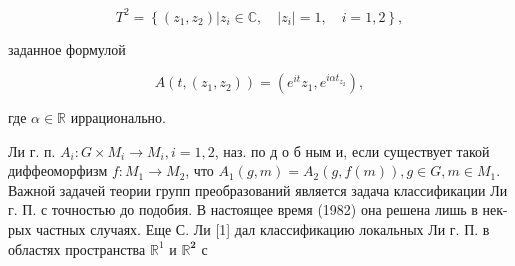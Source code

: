 \documentclass[10pt]{article}
\begin{document}
\[

T^{2}=\left\{\left(z_{1}, z_{2}\right)\left|z_{i} \in \mathbb{C}, \quad\right| z_{i} \mid=1, \quad i=1,2\right\},

\]



заданное формулой



\[

A\left(t,\left(z_{1}, z_{2}\right)\right)=\left(e^{i t} z_{1}, e^{i \alpha t_{z_{2}}}\right),

\]



где $\alpha \in \mathbb{R}$ иррационально.



Ли г. п. $A_{i}: G \times M_{i} \rightarrow M_{i}, i=1,2$, наз. по д о б ным и, если существует такой диффеоморфизм $f: M_{1} \rightarrow M_{2}$, что $A_{1}(g, m)=A_{2}(g, f(m)), g \in G, m \in M_{1}$. Важной задачей теории групп преобразований является задача классификации Ли г. П. с точностью до подобия. В настоящее время (1982) она решена лишь в нек-рых частных случаях. Еще С. Ли [1] дал классификацию локальных Ли г. П. в областях пространства $\mathbb{R}^{1}$ и $\mathbb{R}^{\mathbf{2}}$ с
\end{document}
